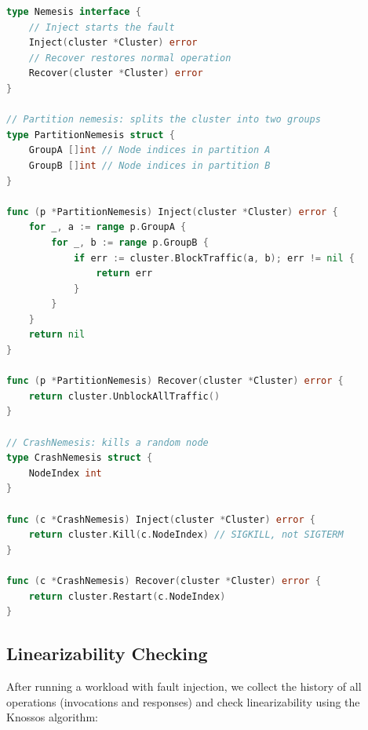 \documentclass[11pt,a4paper]{article}
\begin{document}
\begin{lstlisting}[language=Go,caption={Fault injection test framework}]
type Nemesis interface {
    // Inject starts the fault
    Inject(cluster *Cluster) error
    // Recover restores normal operation
    Recover(cluster *Cluster) error
}

// Partition nemesis: splits the cluster into two groups
type PartitionNemesis struct {
    GroupA []int // Node indices in partition A
    GroupB []int // Node indices in partition B
}

func (p *PartitionNemesis) Inject(cluster *Cluster) error {
    for _, a := range p.GroupA {
        for _, b := range p.GroupB {
            if err := cluster.BlockTraffic(a, b); err != nil {
                return err
            }
        }
    }
    return nil
}

func (p *PartitionNemesis) Recover(cluster *Cluster) error {
    return cluster.UnblockAllTraffic()
}

// CrashNemesis: kills a random node
type CrashNemesis struct {
    NodeIndex int
}

func (c *CrashNemesis) Inject(cluster *Cluster) error {
    return cluster.Kill(c.NodeIndex) // SIGKILL, not SIGTERM
}

func (c *CrashNemesis) Recover(cluster *Cluster) error {
    return cluster.Restart(c.NodeIndex)
}
\end{lstlisting}

\subsection{Linearizability Checking}

After running a workload with fault injection, we collect the history of all operations
(invocations and responses) and check linearizability using the Knossos algorithm:
\end{document}
